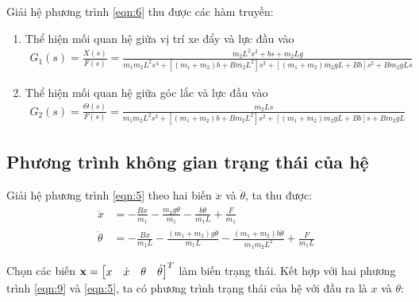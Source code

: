\documentclass[12pt,a4paper]{article}
\begin{document}
Giải hệ phương trình \eqref{eqn:6} thu được các hàm truyền:
\begin{enumerate}
    \item Thể hiện mối quan hệ giữa vị trí xe đẩy và lực đầu vào
    {\footnotesize	
    \begin{align}
        G_1(s)=\frac{X(s)}{F(s)} = \frac{m_2L^2s^2 + bs + m_2Lg}{m_1 m_2 L^2 s^4 + [(m_1 + m_2)b + B m_2 L^2] s^3 + [(m_1 + m_2)m_2 g L + B b] s^2 + B m_2 g L s}
    \end{align}}
    \item Thể hiện mối quan hệ giữa góc lắc và lực đầu vào
    {\footnotesize	
    \begin{align}
        G_2(s)=\frac{\Theta(s)}{F(s)} = \frac{m_2Ls}{m_1 m_2 L^2 s^3 + [(m_1 + m_2)b + B m_2 L^2] s^2 + [(m_1 + m_2)m_2 g L + B b] s + B m_2 g L}
    \end{align}}
\end{enumerate}

\subsection{Phương trình không gian trạng thái của hệ}
Giải hệ phương trình \eqref{eqn:5} theo hai biến $\ddot x$ và $\ddot \theta$, ta thu được:
\begin{align}
    \ddot x & = -\frac{B\dot x}{m_1} - \frac{m_2g\theta}{m_1} - \frac{b\dot\theta}{m_1L} + \frac{F}{m_1}\label{eqn:9}\\
    \ddot \theta & = -\frac{B\dot x}{m_1 L} - \frac{(m_1+m_2)g\theta}{m_1L} - \frac{(m_1+m_2)b\dot\theta}{m_1m_2L^2}+ \frac{F}{m_1L} \label{eqn:10}
\end{align}

Chọn các biến $\vb x = \begin{bmatrix}
    x & \dot x & \theta & \dot\theta 
\end{bmatrix}^T$ làm biến trạng thái. Kết hợp với hai phương trình \eqref{eqn:9} và \eqref{eqn:5}, ta có phương trình trạng thái của hệ với đầu ra là $x$ và $\theta$:
\end{document}
